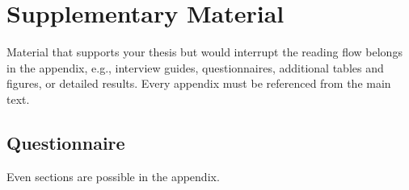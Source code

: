 \chapter{Supplementary Material}\label{chap:appendix:supplementary}

Material that supports your thesis but would interrupt the reading flow belongs in the appendix, e.g., interview guides, questionnaires, additional tables and figures, or detailed results.
Every appendix must be referenced from the main text.

\section{Questionnaire}\label{sec:appendix:questionnaire}

Even sections are possible in the appendix.

